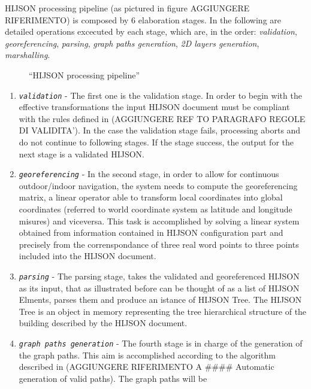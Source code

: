 \documentclass{sig-alternate}
\begin{document}
HIJSON processing pipeline (as pictured in figure AGGIUNGERE
RIFERIMENTO) is composed by 6 elaboration stages. In the following are
detailed operations excecuted by each stage, which are, in the order:
\emph{validation}, \emph{georeferencing}, \emph{parsing}, \emph{graph
paths generation}, \emph{2D layers generation}, \emph{marshalling}.

\begin{figure}[!htbp]
\centering
{}
\caption{``HIJSON processing pipeline''}
\label{fig:pipeline}
\end{figure}

\begin{enumerate}
\def\labelenumi{\arabic{enumi}.}
\itemsep1pt\parskip0pt
\item
 \textit{\texttt{validation}} - The first one is the validation stage. In
 order to begin with the effective transformations the input HIJSON
 document must be compliant with the rules defined in (AGGIUNGERE REF
 TO PARAGRAFO REGOLE DI VALIDITA'). In the case the validation stage
 fails, processing aborts and do not continue to following stages. If
 the stage success, the output for the next stage is a validated
 HIJSON.
\item
 \textit{\texttt{georeferencing}} - In the second stage, in order to allow
 for continuous outdoor/indoor navigation, the system needs to compute
 the georeferencing matrix, a linear operator able to transform local
 coordinates into global coordinates (referred to world coordinate
 system as latitude and longitude misures) and viceversa. This task is
 accomplished by solving a linear system obtained from information
 contained in HIJSON configuration part and precisely from the
 correnspondance of three real word points to three points included
 into the HIJSON document.
\item
 \textit{\texttt{parsing}} - The parsing stage, takes the validated and
 georeferenced HIJSON as its input, that as illustrated before can be
 thought of as a list of HIJSON Elments, parses them and produce an
 istance of HIJSON Tree. The HIJSON Tree is an object in memory
 representing the tree hierarchical structure of the building described
 by the HIJSON document.
\item
 \textit{\texttt{graph paths generation}} - The fourth stage is in charge
 of the generation of the graph paths. This aim is accomplished
 according to the algorithm described in (AGGIUNGERE RIFERIMENTO A
 \#\#\#\# Automatic generation of valid paths). The graph paths will be

\end{enumerate}
\end{document}
